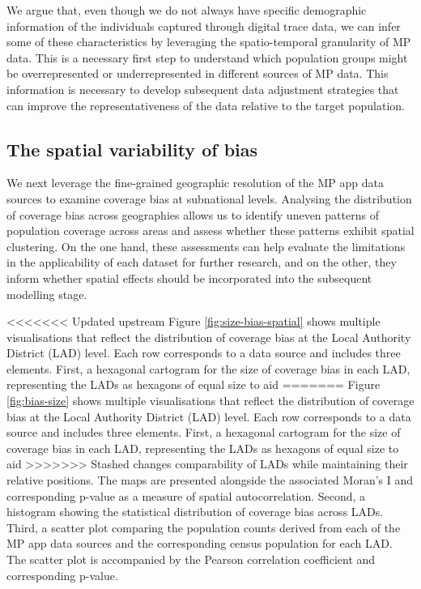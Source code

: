 \documentclass[]{rsos}%
\begin{document}
We argue that, even though we do not always have specific demographic
information of the individuals captured through digital trace data, we
can infer some of these characteristics by leveraging the
spatio-temporal granularity of MP data. This is a necessary first step
to understand which population groups might be overrepresented or
underrepresented in different sources of MP data. This information is
necessary to develop subsequent data adjustment strategies that can
improve the representativeness of the data relative to the target
population.

\subsection{The spatial variability of bias}\label{the-spatial-variability-of-bias}

We next leverage the fine-grained geographic resolution of the MP app
data sources to examine coverage bias at subnational levels. Analysing
the distribution of coverage bias across geographies allows us to
identify uneven patterns of population coverage across areas and assess
whether these patterns exhibit spatial clustering. On the one hand,
these assessments can help evaluate the limitations in the applicability
of each dataset for further research, and on the other, they inform
whether spatial effects should be incorporated into the subsequent
modelling stage.

<<<<<<< Updated upstream
Figure \ref{fig:size-bias-spatial} shows multiple visualisations that
reflect the distribution of coverage bias at the Local Authority
District (LAD) level. Each row corresponds to a data source and includes
three elements. First, a hexagonal cartogram for the size of coverage
bias in each LAD, representing the LADs as hexagons of equal size to aid
=======
Figure \ref{fig:bias-size} shows multiple visualisations that reflect
the distribution of coverage bias at the Local Authority District (LAD)
level. Each row corresponds to a data source and includes three
elements. First, a hexagonal cartogram for the size of coverage bias in
each LAD, representing the LADs as hexagons of equal size to aid
>>>>>>> Stashed changes
comparability of LADs while maintaining their relative positions. The
maps are presented alongside the associated Moran's I and corresponding
p-value as a measure of spatial autocorrelation. Second, a histogram
showing the statistical distribution of coverage bias across LADs.
Third, a scatter plot comparing the population counts derived from each
of the MP app data sources and the corresponding census population for
each LAD. The scatter plot is accompanied by the Pearson correlation
coefficient and corresponding p-value.
\end{document}
